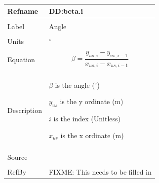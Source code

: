 \documentclass[12pt]{article}
\begin{document}
\noindent \begin{minipage}{\textwidth}
\begin{tabular}{p{} p{}}
\toprule \textbf{Refname} & \textbf{DD:beta.i}
\label{DD:beta.i}
\\ \midrule \\
Label & Angle
\\ \midrule \\
Units & ${}^{\circ}$
\\ \midrule \\
Equation & \begin{dmath}
           β=\frac{{y_{us,i}}-{y_{us,i-1}}}{{x_{us,i}}-{x_{us,i-1}}}
           \end{dmath}
\\ \midrule \\
Description & \begin{symbDescription}
              \item{$β$ is the angle (${}^{\circ}$)}
              \item{${y_{us}}$ is the y ordinate (m)}
              \item{$i$ is the index (Unitless)}
              \item{${x_{us}}$ is the x ordinate (m)}
              \end{symbDescription}
\\ \midrule \\
Source &
\\ \midrule \\
RefBy & FIXME: This needs to be filled in
\\ \bottomrule \end{tabular}
\end{minipage}\\
~\newline
\end{document}
